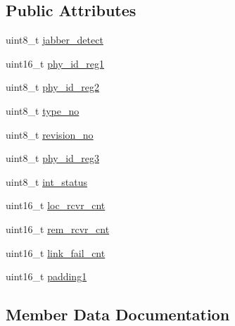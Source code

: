 \subsection*{Public Attributes}
\begin{DoxyCompactItemize}
\item 
uint8\+\_\+t \mbox{\hyperlink{structdiagnostic_data_sh_m_aea0d784161d1ca8341ca45e317c9f1b8}{jabber\+\_\+detect}}
\item 
uint16\+\_\+t \mbox{\hyperlink{structdiagnostic_data_sh_m_a5412678306937d33f7ce540392dd3bee}{phy\+\_\+id\+\_\+reg1}}
\item 
uint8\+\_\+t \mbox{\hyperlink{structdiagnostic_data_sh_m_ad417640c69f6eaf2e2f3677b228438b6}{phy\+\_\+id\+\_\+reg2}}
\item 
uint8\+\_\+t \mbox{\hyperlink{structdiagnostic_data_sh_m_aefd4b509acae31fc6b31afbf4e470c17}{type\+\_\+no}}
\item 
uint8\+\_\+t \mbox{\hyperlink{structdiagnostic_data_sh_m_a6b7ece4c9d83b8829833218e40225a01}{revision\+\_\+no}}
\item 
uint8\+\_\+t \mbox{\hyperlink{structdiagnostic_data_sh_m_a8acd90ad8e4006822e07de11ddd61154}{phy\+\_\+id\+\_\+reg3}}
\item 
uint8\+\_\+t \mbox{\hyperlink{structdiagnostic_data_sh_m_ac1736f9fee4c2b32ae26e3776ad18944}{int\+\_\+status}}
\item 
uint16\+\_\+t \mbox{\hyperlink{structdiagnostic_data_sh_m_ac0c9f1dc4e8f935100b4c9840a873f36}{loc\+\_\+rcvr\+\_\+cnt}}
\item 
uint16\+\_\+t \mbox{\hyperlink{structdiagnostic_data_sh_m_a3f0bf956d0452b349d1d51dcc67e8600}{rem\+\_\+rcvr\+\_\+cnt}}
\item 
uint16\+\_\+t \mbox{\hyperlink{structdiagnostic_data_sh_m_a0d3efa05bf7a22241d54e6e6e9fb3732}{link\+\_\+fail\+\_\+cnt}}
\item 
uint16\+\_\+t \mbox{\hyperlink{structdiagnostic_data_sh_m_a0cbdf2f4de0f1ee3f4b7745a98fc04e8}{padding1}}
\end{DoxyCompactItemize}


\subsection{Member Data Documentation}
\mbox{\label{structdiagnostic_data_sh_m_ac1736f9fee4c2b32ae26e3776ad18944}} 
